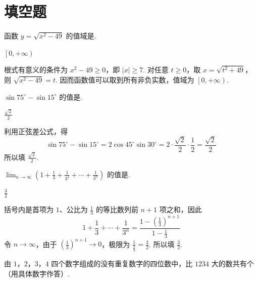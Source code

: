 \documentclass[UTF8,a4paper,oneside,11pt]{ctexbook}
\begin{document}
\section{填空题}

\begin{problem}
函数 \(y=\sqrt{x^2-49}\) 的值域是\fillinblank{}.
\end{problem}

\begin{answer}
\(\left[0,+\infty\right)\)
\end{answer}

\begin{solution}
根式有意义的条件为 \(x^2-49\geqslant0\)，即 \(\lvert x\rvert\geqslant7\). 对任意 \(t\geqslant0\)，取 \(x=\sqrt{t^2+49}\)，则 \(\sqrt{x^2-49}=t\). 因而函数值可以取到所有非负实数，值域为 \(\left[0,+\infty\right)\).
\end{solution}

\begin{problem}
\(\sin 75^\circ-\sin 15^\circ\) 的值是\fillinblank{}.
\end{problem}

\begin{answer}
\(\frac{\sqrt{2}}{2}\)
\end{answer}

\begin{solution}
利用正弦差公式，得
\[
\sin75^\circ-\sin15^\circ
=2\cos45^\circ\sin30^\circ
=2\cdot\frac{\sqrt2}{2}\cdot\frac12
=\frac{\sqrt2}{2}
\]
所以填 \(\frac{\sqrt2}{2}\).
\end{solution}

\begin{problem}
\(\displaystyle\lim_{n\to\infty}\left( 1+\frac{1}{3}+\frac{1}{3^2}+\cdots+\frac{1}{3^n} \right)\) 的值是\fillinblank{}.
\end{problem}

\begin{answer}
\(\frac{3}{2}\)
\end{answer}

\begin{solution}
括号内是首项为 \(1\)、公比为 \(\frac13\) 的等比数列前 \(n+1\) 项之和，因此
\[
1+\frac13+\cdots+\frac1{3^n}
=\frac{1-(\frac{1}{3})^{n+1}}{1-\frac{1}{3}}
\]
令 \(n\to\infty\)，由于 \(\left(\frac13\right)^{n+1}\to0\)，极限为 \(\frac{1}{\frac{2}{3}}=\frac32\). 所以填 \(\frac32\).
\end{solution}

\begin{problem}
由 \(1\)，\(2\)，\(3\)，\(4\) 四个数字组成的没有重复数字的四位数中，比 \(1234\) 大的数共有\fillinblank{}个（用具体数字作答）.
\end{problem}
\end{document}
